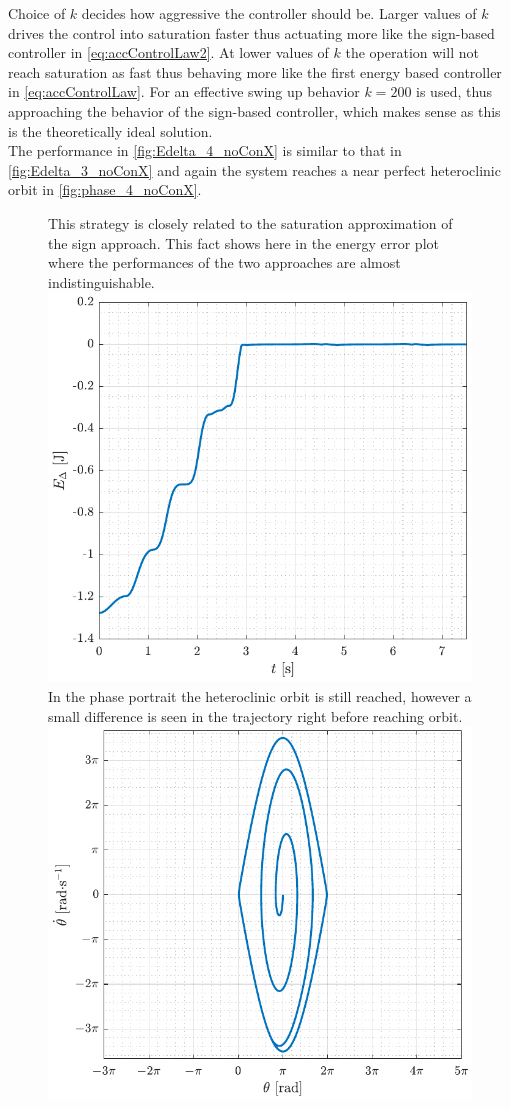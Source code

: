 Choice of $k$ decides how aggressive the controller should be. Larger values of $k$ drives the control into saturation faster thus actuating more like the sign-based controller in \autoref{eq:accControlLaw2}. At lower values of $k$ the operation will not reach saturation as fast thus behaving more like the first energy based controller in \autoref{eq:accControlLaw}. For an effective swing up behavior $k=200$ is used, thus approaching the behavior of the sign-based controller, which makes sense as this is the theoretically ideal solution.\\
The performance in \autoref{fig:Edelta_4_noConX} is similar to that in \autoref{fig:Edelta_3_noConX} and again the system reaches a near perfect heteroclinic orbit in \autoref{fig:phase_4_noConX}.
%
\begin{figure}[H]
  \hspace{-10pt}
  \captionbox
  {
    This strategy is closely related to the saturation approximation of the sign approach. This fact shows here in the energy error plot where the performances of the two approaches are almost indistinguishable.
    \label{fig:Edelta_4_noConX}
  }
  {
    \hspace{-1cm}
    \includegraphics[width=.448\textwidth]{figures/Edelta_4_noConX}
  }
  \hspace{20pt}
  \captionbox 
  {
    In the phase portrait the heteroclinic orbit is still reached, however a small difference is seen in the trajectory right before reaching orbit.
    \label{fig:phase_4_noConX}
  }
  {
    \hspace{-1cm}
    \includegraphics[width=.46\textwidth]{figures/phase_4_noConX}
  }  
\end{figure}
